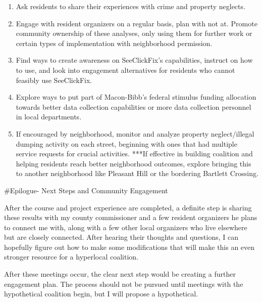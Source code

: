 \documentclass[
]{article}
\begin{document}
\begin{enumerate}
\def\labelenumi{\arabic{enumi}.}
\item
  Ask residents to share their experiences with crime and property
  neglects.
\item
  Engage with resident organizers on a regular basis, plan with not at.
  Promote community ownership of these analyses, only using them for
  further work or certain types of implementation with neighborhood
  permission.
\item
  Find ways to create awareness on SeeClickFix's capabilities, instruct
  on how to use, and look into engagement alternatives for residents who
  cannot feasibly use SeeClickFix.
\item
  Explore ways to put part of Macon-Bibb's federal stimulus funding
  allocation towards better data collection capabilities or more data
  collection personnel in local departments.
\item
  If encouraged by neighborhood, monitor and analyze property
  neglect/illegal dumping activity on each street, beginning with ones
  that had multiple service requests for crucial activities. ***If
  effective in building coalition and helping residents reach better
  neighborhood outcomes, explore bringing this to another neighborhood
  like Pleasant Hill or the bordering Bartlett Crossing.
\end{enumerate}

\#Epilogue- Next Steps and Community Engagement

After the course and project experience are completed, a definite step
is sharing these results with my county commissioner and a few resident
organizers he plans to connect me with, along with a few other local
organizers who live elsewhere but are closely connected. After hearing
their thoughts and questions, I can hopefully figure out how to make
some modifications that will make this an even stronger resource for a
hyperlocal coalition.

After these meetings occur, the clear next step would be creating a
further engagement plan. The process should not be pursued until
meetings with the hypothetical coalition begin, but I will propose a
hypothetical.
\end{document}
